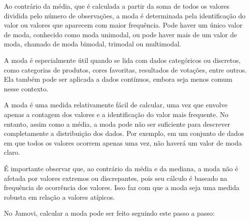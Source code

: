 \begin{figure}[H]
    \label{fig:circulo_moda}
\end{figure}




Ao contrário da média, que é calculada a partir da soma de todos os valores dividida pelo número de observações, a moda é determinada pela identificação do valor ou valores que aparecem com maior frequência. Pode haver um único valor de moda, conhecido como moda unimodal, ou pode haver mais de um valor de moda, chamado de moda bimodal, trimodal ou multimodal.

A moda é especialmente útil quando se lida com dados categóricos ou discretos, como categorias de produtos, cores favoritas, resultados de votações, entre outros. Ela também pode ser aplicada a dados contínuos, embora seja menos comum nesse contexto.

A moda é uma medida relativamente fácil de calcular, uma vez que envolve apenas a contagem dos valores e a identificação do valor mais frequente. No entanto, assim como a média, a moda pode não ser suficiente para descrever completamente a distribuição dos dados. Por exemplo, em um conjunto de dados em que todos os valores ocorrem apenas uma vez, não haverá um valor de moda claro.

É importante observar que, ao contrário da média e da mediana, a moda não é afetada por valores extremos ou discrepantes, pois seu cálculo é baseado na frequência de ocorrência dos valores. Isso faz com que a moda seja uma medida robusta em relação a valores atípicos.

No Jamovi, calcular a moda pode ser feito seguindo este passo a passo:

